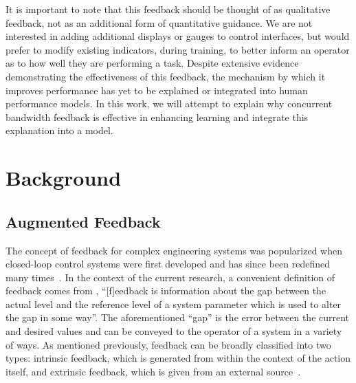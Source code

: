 It is important to note that this feedback should be thought of as qualitative feedback, not as an additional form of quantitative guidance.
We are not interested in adding additional displays or gauges to control interfaces, but would prefer to modify existing indicators, during training, to better inform an operator as to how well they are performing a task.
Despite extensive evidence demonstrating the effectiveness of this feedback, the mechanism by which it improves performance has yet to be explained or integrated into human performance models.
In this work, we will attempt to explain why concurrent bandwidth feedback is effective in enhancing learning and integrate this explanation into a model.

\section{Background}

\subsection{Augmented Feedback}

The concept of feedback for complex engineering systems was popularized when closed-loop control systems were first developed and has since been redefined many times~\citep{Wierner1948}.
In the context of the current research, a convenient definition of feedback comes from \citeauthor{ramaprasad_definition_1983}, ``[f]eedback is information about the gap between the actual level and the reference level of a system parameter which is used to alter the gap in some way''.
The aforementioned ``gap'' is the error between the current and desired values and can be conveyed to the operator of a system in a variety of ways.
As mentioned previously, feedback can be broadly classified into two types: intrinsic feedback, which is generated from within the context of the action itself, and extrinsic feedback, which is given from an external source~\citep{laurillard_rethinking_2002}.


